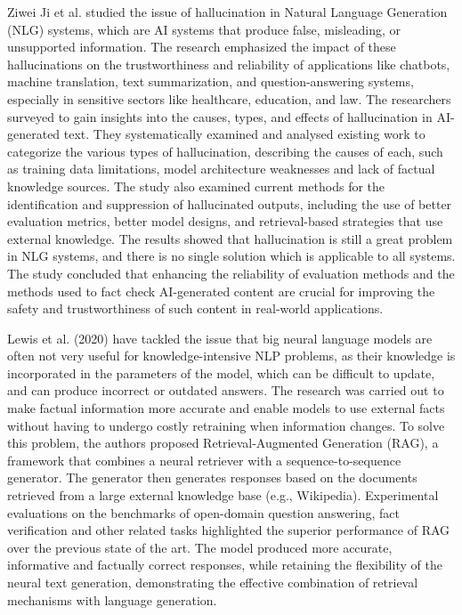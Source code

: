 \vspace{1em}
Ziwei Ji et al. studied the issue of hallucination in Natural Language Generation (NLG) systems, which are AI systems that produce false, misleading, or unsupported information\cite{ji2023hallucination}. The research emphasized the impact of these hallucinations on the trustworthiness and reliability of applications like chatbots, machine translation, text summarization, and question-answering systems, especially in sensitive sectors like healthcare, education, and law. The researchers surveyed to gain insights into the causes, types, and effects of hallucination in AI-generated text. They systematically examined and analysed existing work to categorize the various types of hallucination, describing the causes of each, such as training data limitations, model architecture weaknesses and lack of factual knowledge sources. The study also examined current methods for the identification and suppression of hallucinated outputs, including the use of better evaluation metrics, better model designs, and retrieval-based strategies that use external knowledge. The results showed that hallucination is still a great problem in NLG systems, and there is no single solution which is applicable to all systems. The study concluded that enhancing the reliability of evaluation methods and the methods used to fact check AI-generated content are crucial for improving the safety and trustworthiness of such content in real-world applications.

\vspace{1em}
Lewis et al. (2020) have tackled the issue that big neural language models are often not very useful for knowledge-intensive NLP problems, as their knowledge is incorporated in the parameters of the model, which can be difficult to update, and can produce incorrect or outdated answers\cite{lewis2020rag}. The research was carried out to make factual information more accurate and enable models to use external facts without having to undergo costly retraining when information changes. To solve this problem, the authors proposed Retrieval-Augmented Generation (RAG), a framework that combines a neural retriever with a sequence-to-sequence generator. The generator then generates responses based on the documents retrieved from a large external knowledge base (e.g., Wikipedia). Experimental evaluations on the benchmarks of open-domain question answering, fact verification and other related tasks highlighted the superior performance of RAG over the previous state of the art. The model produced more accurate, informative and factually correct responses, while retaining the flexibility of the neural text generation, demonstrating the effective combination of retrieval mechanisms with language generation.  

